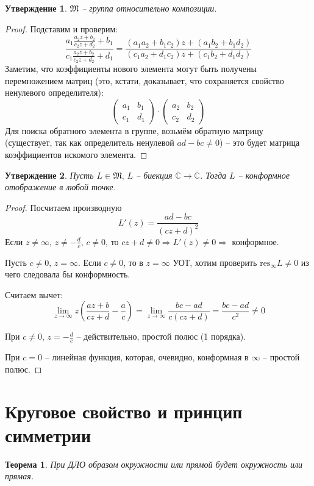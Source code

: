 \documentclass[a4paper,12pt]{article}
\theoremstyle{plain}
\newtheorem{theorem}{Теорема}[section]
\newtheorem{proposition}{Утверждение}[section]
\theoremstyle{definition}
\theoremstyle{remark}
\begin{document}
\begin{proposition}
	$\mathfrak{M}$ -- группа относительно композиции.
\end{proposition}

\begin{proof}
	Подставим и проверим:
	\[
		\frac{a_1\frac{a_2z + b_2}{c_2z + d_2} + b_1}{c_1\frac{a_2z + b_2}{c_2z + d_2} + d_1} = \frac{(a_1a_2 + b_1c_2)z + (a_1b_2 + b_1d_2)}{(c_1a_2 + d_1c_2)z + (c_1b_2 + d_1d_2)}
	\]
	Заметим, что коэффициенты нового элемента могут быть получены перемножением матриц (это, кстати, доказывает, что сохраняется свойство ненулевого определителя):
	\[
		\begin{pmatrix}
			a_1 & b_1 \\
			c_1 & d_1
		\end{pmatrix}
		\cdot
		\begin{pmatrix}
			a_2 & b_2 \\
			c_2 & d_2
		\end{pmatrix}
	\]
	Для поиска обратного элемента в группе, возьмём обратную матрицу (существует, так как определитель ненулевой $ad - bc \neq 0$) -- это будет матрица коэффициентов искомого элемента.
\end{proof}

\begin{proposition}
	Пусть $L \in \mathfrak{M},\, L$ -- биекция $\overline{\mathbb{C}} \to \overline{\mathbb{C}}$. Тогда $L$ -- конформное отображение в любой точке.
\end{proposition}

\begin{proof}
	Посчитаем производную
	\[
		L'(z) = \frac{ad - bc}{(cz + d)^2}
	\]
	Если $z \neq \infty,\, z \neq -\frac{d}{c},\, c \neq 0$, то $cz + d \neq 0 \Rightarrow L'(z) \neq 0 \Rightarrow$ конформное.

	Пусть $c \neq 0,\, z = \infty$. Если $c \neq 0$, то в $z = \infty$ УОТ, хотим проверить $\text{res}_\infty L \neq 0$ из чего следовала бы конформность.

	Считаем вычет:
	\[
		\lim_{z \to \infty} z\left(\frac{az + b}{cz + d} - \frac{a}{c}\right) = \lim_{z \to \infty} \frac{bc - ad}{c(cz + d)} = \frac{bc - ad}{c^2} \neq 0
	\]

	При $c \neq 0,\, z = -\frac{d}{c}$ -- действительно, простой полюс (1 порядка).

	При $c = 0$ -- линейная функция, которая, очевидно, конформная в $\infty$ -- простой полюс.
\end{proof}

\section{Круговое свойство и принцип симметрии}
\begin{theorem}
	При ДЛО образом окружности или прямой будет окружность или прямая.
\end{theorem}
\end{document}
